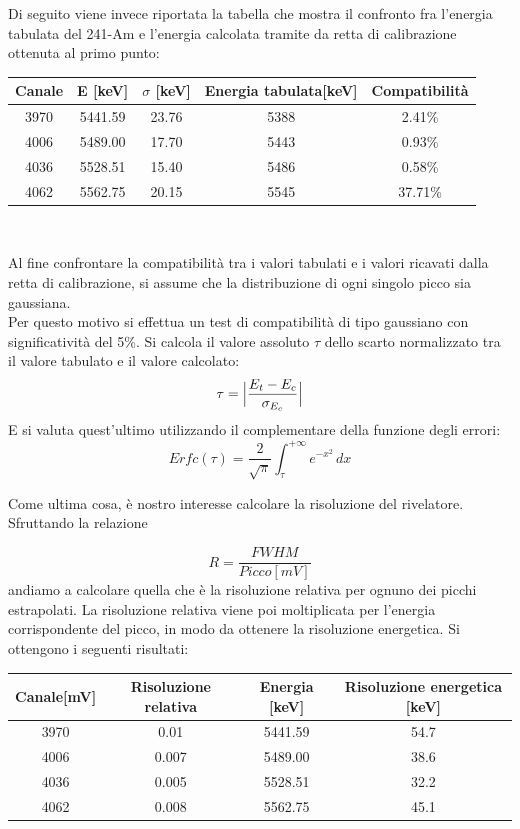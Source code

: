 \documentclass[a4paper,10pt]{article}
\begin{document}
\noindent Di seguito viene invece riportata la tabella che mostra il confronto fra l'energia tabulata del 241-Am e l'energia calcolata tramite da retta di calibrazione ottenuta al primo punto:

\begin{center}
    \begin{tabular}{ccccc}
        \toprule
        Canale & E [keV] & $\sigma$ [keV] & Energia tabulata[keV] & Compatibilit\`a \\
        \midrule
        3970 & 5441.59 & 23.76 & 5388 & 2.41\%\\
        4006 & 5489.00 & 17.70 & 5443 & 0.93\%\\
        4036 & 5528.51 & 15.40 & 5486 & 0.58\%\\
        4062 & 5562.75 & 20.15 & 5545 & 37.71\%\\
        \bottomrule
    \end{tabular}\\
\end{center}

\noindent Al fine confrontare la compatibilit\`a tra i valori tabulati e i valori ricavati dalla retta di calibrazione, si assume che la distribuzione di ogni singolo picco sia gaussiana.\\
Per questo motivo si effettua un test di compatibilit\`a di tipo gaussiano con significativit\`a del 5\%.
Si calcola il valore assoluto $\tau$ dello scarto normalizzato tra il valore tabulato e il valore calcolato:
$$
    \tau = \abs\Big{\frac{E_t - E_c}{\sigma_{E_c}}}
$$
E si valuta quest'ultimo utilizzando il complementare della funzione degli errori:
$$
    Erfc(\tau) = \frac{2}{\sqrt{\pi}}\int_{\tau}^{+\infty} e^{-x^2}\, dx
$$

\noindent Come ultima cosa, \`e nostro interesse calcolare la risoluzione del rivelatore. Sfruttando la relazione

$$
    R=\frac{FWHM}{Picco[mV]}
$$
andiamo a calcolare quella che \`e la risoluzione relativa per ognuno dei picchi estrapolati. La risoluzione relativa viene poi moltiplicata per l'energia corrispondente del picco, in modo da ottenere la risoluzione energetica. Si ottengono i seguenti risultati:

\begin{center}
    \begin{tabular}{cccc}
        \toprule
        Canale[mV] & Risoluzione relativa & Energia [keV] & Risoluzione energetica [keV] \\
        \midrule
        3970 & 0.01 & 5441.59 & 54.7\\
        4006 & 0.007 & 5489.00 & 38.6\\
        4036 & 0.005 & 5528.51 & 32.2\\
        4062 & 0.008 & 5562.75 & 45.1\\
        \bottomrule
    \end{tabular}\\
\end{center}
\end{document}
